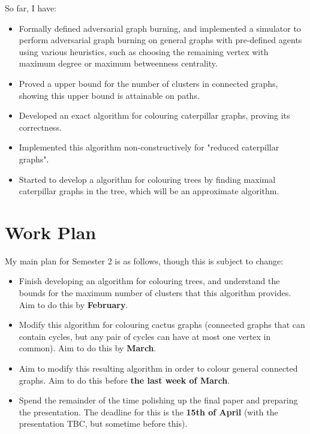 \documentclass{mprop}
\begin{document}
So far, I have:

\begin{itemize}
    \item Formally defined adversarial graph burning, and implemented a simulator to perform adversarial graph burning on general graphs with pre-defined agents using various heuristics, such as choosing the remaining vertex with maximum degree or maximum betweenness centrality.
    \item Proved a upper bound for the number of clusters in connected graphs, showing this upper bound is attainable on paths.
    \item Developed an exact algorithm for colouring caterpillar graphs, proving its correctness.
    \item Implemented this algorithm non-constructively for "reduced caterpillar graphs".
    \item Started to develop a algorithm for colouring trees by finding maximal caterpillar graphs in the tree, which will be an approximate algorithm.
\end{itemize}

\section{Work Plan}

My main plan for Semester 2 is as follows, though this is subject to change:

\begin{itemize}
    \item Finish developing an algorithm for colouring trees, and understand the bounds for the maximum number of clusters that this algorithm provides. Aim to do this by \textbf{February}.
    \item Modify this algorithm for colouring cactus graphs (connected graphs that can contain cycles, but any pair of cycles can have at most one vertex in common). Aim to do this by \textbf{March}.
    \item Aim to modify this resulting algorithm in order to colour general connected graphs. Aim to do this before \textbf{the last week of March}.
    \item Spend the remainder of the time polishing up the final paper and preparing the presentation. The deadline for this is the \textbf{15th of April} (with the presentation TBC, but sometime before this).
\end{itemize}



\end{document}
